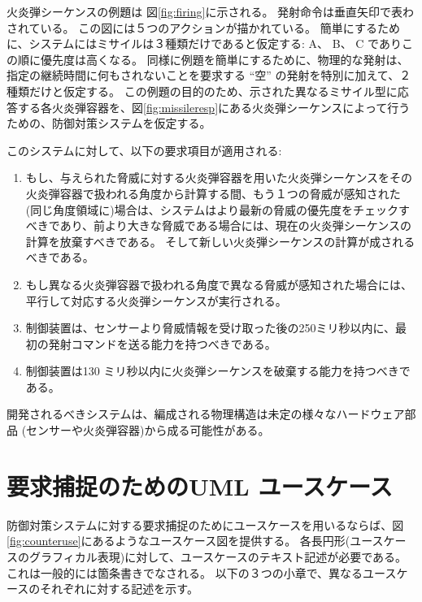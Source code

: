 \documentclass[\pformat,12pt]{jreport}
\begin{document}
火炎弾シーケンスの例題は 図\ref{fig:firing}に示される。
発射命令は垂直矢印で表わされている。
この図には５つのアクションが描かれている。
簡単にするために、システムにはミサイルは３種類だけであると仮定する: A、 B、 C でありこの順に優先度は高くなる。
同様に例題を簡単にするために、物理的な発射は、指定の継続時間に何もされないことを要求する ``空'' の発射を特別に加えて、２種類だけと仮定する。 
この例題の目的のため、示された異なるミサイル型に応答する各火炎弾容器を、図\ref{fig:missileresp}にある火炎弾シーケンスによって行うための、防御対策システムを仮定する。

このシステムに対して、以下の要求項目が適用される:

\begin{enumerate}
\item もし、与えられた脅威に対する火炎弾容器を用いた火炎弾シーケンスをその火炎弾容器で扱われる角度から計算する間、もう１つの脅威が感知された(同じ角度領域に)場合は、システムはより最新の脅威の優先度をチェックすべきであり、前より大きな脅威である場合には、現在の火炎弾シーケンスの計算を放棄すべきである。
そして新しい火炎弾シーケンスの計算が成されるべきである。
\item もし異なる火炎弾容器で扱われる角度で異なる脅威が感知された場合には、平行して対応する火炎弾シーケンスが実行される。
\item 制御装置は、センサーより脅威情報を受け取った後の250ミリ秒以内に、最初の発射コマンドを送る能力を持つべきである。\label{timereq34}
\item 制御装置は130 ミリ秒以内に火炎弾シーケンスを破棄する能力を持つべきである。
\end{enumerate}

開発されるべきシステムは、編成される物理構造は未定の様々なハードウェア部品 (センサーや火炎弾容器)から成る可能性がある。

\section{要求捕捉のためのUML ユースケース}\label{sec:UMLreq} 
\label{sec:usecase}

防御対策システムに対する要求捕捉のためにユースケースを用いるならば、図\ref{fig:counteruse}にあるようなユースケース図を提供する。
各長円形(ユースケースのグラフィカル表現)に対して、ユースケースのテキスト記述が必要である。
これは一般的には箇条書きでなされる。
以下の３つの小章で、異なるユースケースのそれぞれに対する記述を示す。
\end{document}
